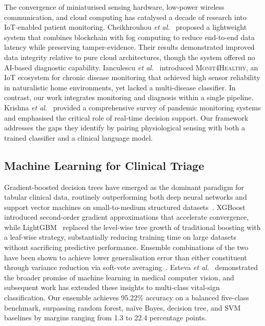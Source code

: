 \documentclass[journal]{IEEEtran}
\begin{document}
The convergence of miniaturised sensing hardware, low-power wireless
communication, and cloud computing has catalysed a decade of research into
IoT-enabled patient monitoring. Cheikhrouhou \textit{et al.}~\cite{cheikhrouhou2023}
proposed a lightweight system that combines blockchain with fog computing to
reduce end-to-end data latency while preserving tamper-evidence. Their results
demonstrated improved data integrity relative to pure cloud architectures,
though the system offered no AI-based diagnostic capability. Ianculescu
\textit{et al.}~\cite{ianculescu2025} introduced \textsc{Monit4Healthy}, an
IoT ecosystem for chronic disease monitoring that achieved high sensor
reliability in naturalistic home environments, yet lacked a multi-disease
classifier. In contrast, our work integrates monitoring and diagnosis within
a single pipeline. Krishna \textit{et al.}~\cite{krishna2023} provided a
comprehensive survey of pandemic monitoring systems and emphasised the
critical role of real-time decision support. Our framework addresses the
gaps they identify by pairing physiological sensing with both a trained
classifier and a clinical language model.

\subsection{Machine Learning for Clinical Triage}

Gradient-boosted decision trees have emerged as the dominant paradigm for
tabular clinical data, routinely outperforming both deep neural networks and
support vector machines on small-to-medium structured datasets~\cite{grinsztajn2022}.
XGBoost~\cite{chen2016} introduced second-order gradient approximations that
accelerate convergence, while LightGBM~\cite{ke2017} replaced the
level-wise tree growth of traditional boosting with a leaf-wise strategy,
substantially reducing training time on large datasets without sacrificing
predictive performance. Ensemble combinations of the two have been shown to
achieve lower generalisation error than either constituent through variance
reduction via soft-vote averaging~\cite{zhou2021}. Esteva
\textit{et al.}~\cite{esteva2021} demonstrated the broader promise of
machine learning in medical computer vision, and subsequent work has extended
these insights to multi-class vital-sign classification. Our ensemble
achieves 95.22\% accuracy on a balanced five-class benchmark, surpassing
random forest, na\"ive Bayes, decision tree, and SVM baselines by margins
ranging from 1.3 to 22.4 percentage points.
\end{document}
